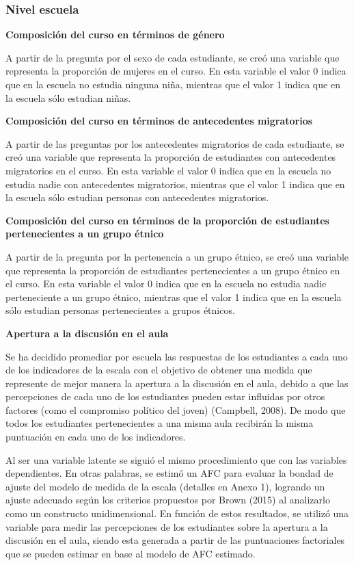 \documentclass[12pt,twoside]{templates/facsothesis}
\begin{document}
\hypertarget{nivel-escuela}{%
\subsubsection{Nivel escuela}\label{nivel-escuela}}

\textbf{Composición del curso en términos de género}

A partir de la pregunta por el sexo de cada estudiante, se creó una variable que representa la proporción de mujeres en el curso. En esta variable el valor 0 indica que en la escuela no estudia ninguna niña, mientras que el valor 1 indica que en la escuela sólo estudian niñas.

\textbf{Composición del curso en términos de antecedentes migratorios}

A partir de las preguntas por los antecedentes migratorios de cada estudiante, se creó una variable que representa la proporción de estudiantes con antecedentes migratorios en el curso. En esta variable el valor 0 indica que en la escuela no estudia nadie con antecedentes migratorios, mientras que el valor 1 indica que en la escuela sólo estudian personas con antecedentes migratorios.

\textbf{Composición del curso en términos de la proporción de estudiantes pertenecientes a un grupo étnico}

A partir de la pregunta por la pertenencia a un grupo étnico, se creó una variable que representa la proporción de estudiantes pertenecientes a un grupo étnico en el curso. En esta variable el valor 0 indica que en la escuela no estudia nadie perteneciente a un grupo étnico, mientras que el valor 1 indica que en la escuela sólo estudian personas pertenecientes a grupos étnicos.

\textbf{Apertura a la discusión en el aula}

Se ha decidido promediar por escuela las respuestas de los estudiantes a cada uno de los indicadores de la escala con el objetivo de obtener una medida que represente de mejor manera la apertura a la discusión en el aula, debido a que las percepciones de cada uno de los estudiantes pueden estar influidas por otros factores (como el compromiso político del joven) (Campbell, 2008). De modo que todos los estudiantes pertenecientes a una misma aula recibirán la misma puntuación en cada uno de los indicadores.

Al ser una variable latente se siguió el mismo procedimiento que con las variables dependientes. En otras palabras, se estimó un AFC para evaluar la bondad de ajuste del modelo de medida de la escala (detalles en Anexo 1), logrando un ajuste adecuado según los criterios propuestos por Brown (2015) al analizarlo como un constructo unidimensional. En función de estos resultados, se utilizó una variable para medir las percepciones de los estudiantes sobre la apertura a la discusión en el aula, siendo esta generada a partir de las puntuaciones factoriales que se pueden estimar en base al modelo de AFC estimado.
\end{document}
